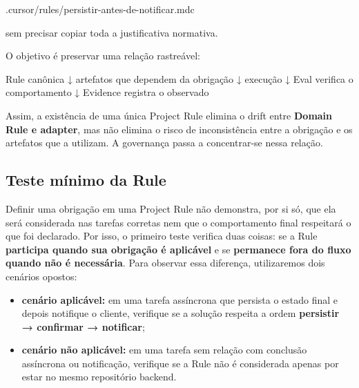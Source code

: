 \documentclass[
  10pt,
  a4paper,
  oneside]{book}
\newenvironment{Shaded}{}{}
\newcommand{\NormalTok}[1]{#1}
\providecommand{\tightlist}{%
  \setlength{\itemsep}{0pt}\setlength{\parskip}{0pt}}
\renewenvironment{Shaded}{\begin{snugshade}}{\end{snugshade}}%
\begin{document}
\begin{Shaded}
\begin{Highlighting}[]
\NormalTok{.cursor/rules/persistir{-}antes{-}de{-}notificar.mdc}
\end{Highlighting}
\end{Shaded}

sem precisar copiar toda a justificativa normativa.

O objetivo é preservar uma relação rastreável:

\begin{Shaded}
\begin{Highlighting}[]
\NormalTok{Rule canônica}
\NormalTok{      ↓}
\NormalTok{artefatos que dependem da obrigação}
\NormalTok{      ↓}
\NormalTok{execução}
\NormalTok{      ↓}
\NormalTok{Eval verifica o comportamento}
\NormalTok{      ↓}
\NormalTok{Evidence registra o observado}
\end{Highlighting}
\end{Shaded}

Assim, a existência de uma única Project Rule elimina o drift entre
\textbf{Domain Rule e adapter}, mas não elimina o risco de
inconsistência entre a obrigação e os artefatos que a utilizam. A
governança passa a concentrar-se nessa relação.

\hypertarget{teste-muxednimo-da-rule}{%
\subsection{Teste mínimo da Rule}\label{teste-muxednimo-da-rule}}

Definir uma obrigação em uma Project Rule não demonstra, por si só, que
ela será considerada nas tarefas corretas nem que o comportamento final
respeitará o que foi declarado. Por isso, o primeiro teste verifica duas
coisas: se a Rule \textbf{participa quando sua obrigação é aplicável} e
se \textbf{permanece fora do fluxo quando não é necessária}. Para
observar essa diferença, utilizaremos dois cenários opostos:

\begin{itemize}
\tightlist
\item
  \textbf{cenário aplicável:} em uma tarefa assíncrona que persista o
  estado final e depois notifique o cliente, verifique se a solução
  respeita a ordem \textbf{persistir → confirmar → notificar};
\item
  \textbf{cenário não aplicável:} em uma tarefa sem relação com
  conclusão assíncrona ou notificação, verifique se a Rule não é
  considerada apenas por estar no mesmo repositório backend.
\end{itemize}
\end{document}
